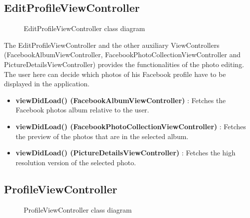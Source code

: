 \subsection{EditProfileViewController} 
\begin{figure}[H]
\caption{EditProfileViewController class diagram}
\end{figure}


The EditProfileViewController and the other auxiliary ViewControllers (FacebookAlbumViewController, FacebookPhotoCollectionViewController and PictureDetailsViewController) provides the functionalities of the photo editing. The user here can decide which photos of his Facebook profile have to be displayed in the application.

\begin{itemize}
\item \textbf{viewDidLoad() (FacebookAlbumViewController)} : Fetches the Facebook photos album relative to the user.
\item \textbf{viewDidLoad() (FacebookPhotoCollectionViewController)} : Fetches the preview of the photos that are in the selected album.
\item \textbf{viewDidLoad() (PictureDetailsViewController)} : Fetches the high resolution version of the selected photo.
\end{itemize}


\subsection{ProfileViewController} 

\begin{figure}[H]
\caption{ProfileViewController class diagram}
\end{figure}


